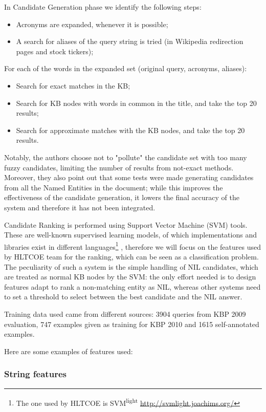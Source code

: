 \documentclass[a4paper,11pt]{report}
\begin{document}
In Candidate Generation phase we identify the following steps:
\begin{itemize}
\item Acronyms are expanded, whenever it is possible;
\item A search for aliases of the query string is tried (in Wikipedia redirection pages and stock tickers);
\end{itemize}

For each of the words in the expanded set (original query, acronyms, aliases):
\begin{itemize}

\item Search for exact matches in the KB;
\item Search for KB nodes with words in common in the title, and take the top 20 results;
\item Search for approximate matches with the KB nodes, and take the top 20 results.
\end{itemize}

Notably, the authors choose not to "pollute" the candidate set with too many fuzzy candidates, limiting the number of results from not-exact methods. Moreover, they also point out that some tests were made generating candidates from all the Named Entities in the document; while this improves the effectiveness of the candidate generation, it lowers the final accuracy of the system and therefore it has not been integrated.

Candidate Ranking is performed using Support Vector Machine (SVM) tools. These are well-known supervised learning models, of which implementations and libraries exist in different languages\footnote{The one used by HLTCOE is SVM\textsuperscript{light} \url{http://svmlight.joachims.org/}}
, therefore we will focus on the features used by HLTCOE team for the ranking, which can be seen as a classification problem. The peculiarity of such a system is the simple handling of NIL candidates, which are treated as normal KB nodes by the SVM: the only effort needed is to design features adapt to rank a non-matching entity as NIL, whereas other systems need to set a threshold to select between the best candidate and the NIL answer.

Training data used came from different sources: 3904 queries from KBP 2009 evaluation, 747 examples given as training for KBP 2010 and 1615 self-annotated examples.

Here are some examples of features used:
\subsubsection{String features}
\end{document}
